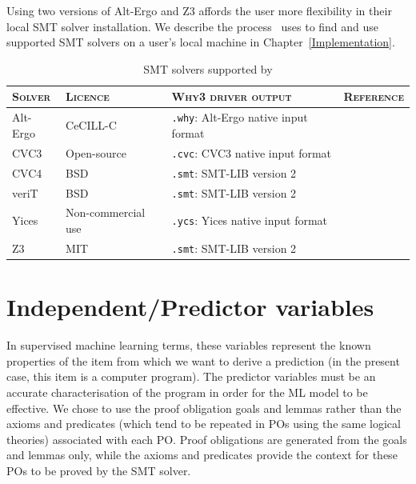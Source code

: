 Using two versions of Alt-Ergo and Z3 affords the user more flexibility in their local SMT solver installation. 
We describe the process \where~uses to find and use supported SMT solvers on a user's local machine in Chapter~\ref{Implementation}. 

\begin{table}
	\caption[SMT solvers supported by \where]{SMT solvers supported by \where}
 
		\begin{tabularx}{\textwidth}{@{}YYYc@{}}
			\toprule
			\textsc{Solver} &  \textsc{Licence} & \textsc{Why3 driver output} & \textsc{Reference} \\
			\midrule
			Alt-Ergo & CeCILL-C & \texttt{.why}: Alt-Ergo native input format & \cite{AltErgo} \\ 
			\midrule
			CVC3 & Open-source & \texttt{.cvc}: CVC3 native input format & \cite{CVC3} \\
			\midrule
			CVC4 & BSD & \texttt{.smt}: SMT-LIB version 2 & \cite{CVC4} \\ 
			\midrule
			veriT & BSD & \texttt{.smt}: SMT-LIB version 2 & \cite{veriT} \\
			\midrule
			Yices & Non-commercial use & \texttt{.ycs}: Yices native input format & \cite{Yices} \\
			\midrule
			Z3 & MIT & \texttt{.smt}: SMT-LIB version 2 & \cite{Z3} \\
			\bottomrule	
			
		\end{tabularx}
	
	\label{table:solvers}
\end{table}


\section{Independent/Predictor variables}
\label{sec:independant}

In supervised machine learning terms, these variables represent the known properties of the item from which we want to derive a prediction (in the present case, this item is a computer program). 
The predictor variables must be an accurate characterisation of the program in order for the ML model to be effective. 
We chose to use the proof obligation goals and lemmas rather than the axioms and predicates (which tend to be repeated in POs using the same logical theories) associated with each PO. 
Proof obligations are generated from the goals and lemmas only, while the axioms and predicates provide the context for these POs to be proved by the SMT solver.

